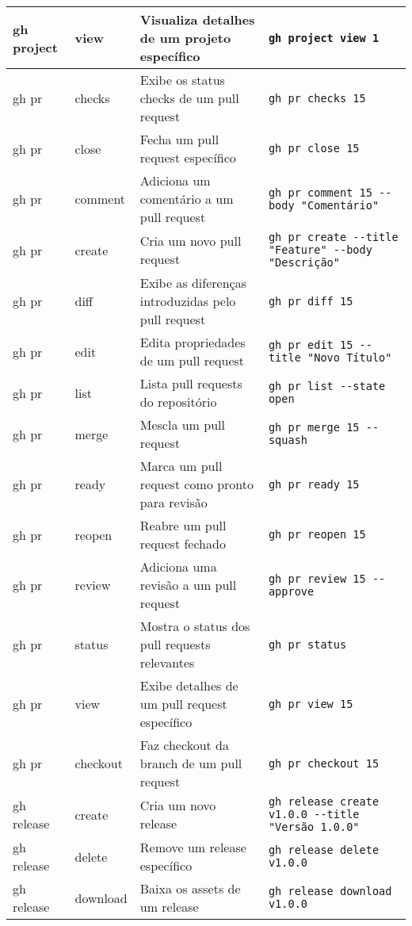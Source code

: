 \begin{longtable}{|p{2cm}|p{2.3cm}|p{4cm}|p{6cm}|}
    \hline
    gh project & view & Visualiza detalhes de um projeto específico & \texttt{gh project view 1} \\
    \hline
    gh pr & checks & Exibe os status checks de um pull request & \texttt{gh pr checks 15} \\
    \hline
    gh pr & close & Fecha um pull request específico & \texttt{gh pr close 15} \\
    \hline
    gh pr & comment & Adiciona um comentário a um pull request & \texttt{gh pr comment 15 -{-}body "Comentário"} \\
    \hline
    gh pr & create & Cria um novo pull request & \texttt{gh pr create -{-}title "Feature" -{-}body "Descrição"} \\
    \hline
    gh pr & diff & Exibe as diferenças introduzidas pelo pull request & \texttt{gh pr diff 15} \\
    \hline
    gh pr & edit & Edita propriedades de um pull request & \texttt{gh pr edit 15 -{-}title "Novo Título"} \\
    \hline
    gh pr & list & Lista pull requests do repositório & \texttt{gh pr list -{-}state open} \\
    \hline
    gh pr & merge & Mescla um pull request & \texttt{gh pr merge 15 -{-}squash} \\
    \hline
    gh pr & ready & Marca um pull request como pronto para revisão & \texttt{gh pr ready 15} \\
    \hline
    gh pr & reopen & Reabre um pull request fechado & \texttt{gh pr reopen 15} \\
    \hline
    gh pr & review & Adiciona uma revisão a um pull request & \texttt{gh pr review 15 -{-}approve} \\
    \hline
    gh pr & status & Mostra o status dos pull requests relevantes & \texttt{gh pr status} \\
    \hline
    gh pr & view & Exibe detalhes de um pull request específico & \texttt{gh pr view 15} \\
    \hline
    gh pr & checkout & Faz checkout da branch de um pull request & \texttt{gh pr checkout 15} \\
    \hline
    gh release & create & Cria um novo release & \texttt{gh release create v1.0.0 -{-}title "Versão 1.0.0"} \\
    \hline
    gh release & delete & Remove um release específico & \texttt{gh release delete v1.0.0} \\
    \hline
    gh release & download & Baixa os assets de um release & \texttt{gh release download v1.0.0} \\

\end{longtable}
